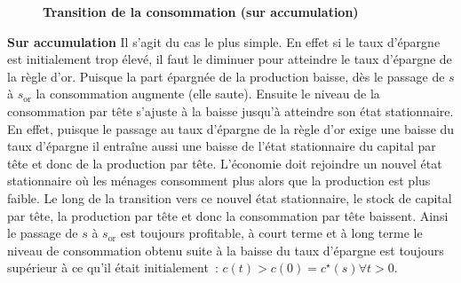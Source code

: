\documentclass[10pt,a4paper,notitlepage]{report}
\begin{document}
\begin{wrapfigure}{r}{0.5\textwidth}
  \vspace{-20pt}
  \begin{center}
    
  \end{center}
  \vspace{-10pt}
  \caption{\textbf{Transition de la consommation (sur accumulation)}}
  \vspace{-10pt}
\end{wrapfigure}
\textbf{Sur accumulation} Il s'agit du cas le plus simple. En effet si
le taux  d'épargne est  initialement trop élevé,  il faut  le diminuer
pour atteindre  le taux d'épargne  de la  règle d'or. Puisque  la part
épargnée  de   la  production  baisse,   dès  le  passage  de   $s$  à
$s_{\mathrm{or}}$ la  consommation augmente (elle saute).   Ensuite le
niveau  de la  consommation  par  tête s'ajuste  à  la baisse  jusqu'à
atteindre son état stationnaire. En  effet, puisque le passage au taux
d'épargne  de la  règle d'or  exige une  baisse du  taux d'épargne  il
entraîne aussi une  baisse de l'état stationnaire du  capital par tête
et donc de la production par tête. L'économie doit rejoindre un nouvel
état  stationnaire  où  les  ménages  consomment  plus  alors  que  la
production est  plus faible. Le long  de la transition vers  ce nouvel
état stationnaire,  le stock  de capital par  tête, la  production par
tête et donc  la consommation par tête baissent.  Ainsi  le passage de
$s$ à  $s_{\mathrm{or}}$ est toujours  profitable, à court terme  et à
long terme le niveau de consommation  obtenu suite à la baisse du taux
d'épargne  est  toujours  supérieur  à  ce  qu'il  était  initialement : $c(t)>c(0)=c^{\star}(s) \forall t >0$.\newline
\end{document}
